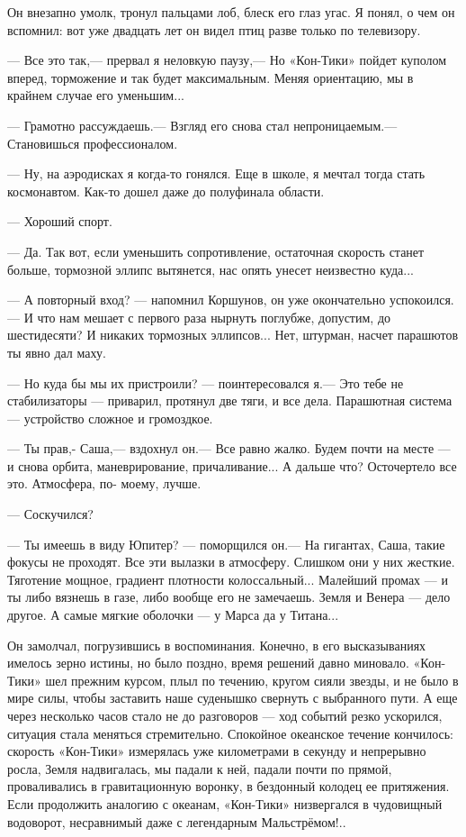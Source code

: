 \documentclass[11pt,a4paper,oneside]{article}
\begin{document}
Он внезапно умолк, тронул пальцами лоб, блеск его глаз угас. Я понял, о чем он вспомнил: вот уже двадцать лет он видел птиц разве только по телевизору.

— Все это так,— прервал я неловкую паузу,— Но «Кон-Тики» пойдет куполом вперед, торможение и так будет максимальным. Меняя ориентацию, мы в крайнем случае его уменьшим...

— Грамотно рассуждаешь.— Взгляд его снова стал непроницаемым.— Становишься профессионалом.

— Ну, на аэродисках я когда-то гонялся. Еще в школе, я мечтал тогда стать космонавтом. Как-то дошел даже до полуфинала области.

— Хороший спорт.

— Да. Так вот, если уменьшить сопротивление, остаточная скорость станет больше, тормозной эллипс вытянется, нас опять унесет неизвестно куда...

— А повторный вход? — напомнил Коршунов, он уже окончательно успокоился.— И что нам мешает с первого раза нырнуть поглубже, допустим, до шестидесяти? И никаких тормозных эллипсов... Нет, штурман, насчет парашютов ты явно дал маху.

— Но куда бы мы их пристроили? — поинтересовался я.— Это тебе не стабилизаторы — приварил, протянул две тяги, и все дела. Парашютная система — устройство сложное и громоздкое.

— Ты прав,- Саша,— вздохнул он.— Все равно жалко. Будем почти на месте — и снова орбита, маневрирование, причаливание... А дальше что? Осточертело все это. Атмосфера, по- моему, лучше.

— Соскучился?

— Ты имеешь в виду Юпитер? — поморщился он.— На гигантах, Саша, такие фокусы не проходят. Все эти вылазки в атмосферу. Слишком они у них жесткие. Тяготение мощное, градиент плотности колоссальный... Малейший промах — и ты либо вязнешь в газе, либо вообще его не замечаешь. Земля и Венера — дело другое. А самые мягкие оболочки — у Марса да у Титана...

Он замолчал, погрузившись в воспоминания. Конечно, в его высказываниях имелось зерно истины, но было поздно, время решений давно миновало. «Кон-Тики» шел прежним курсом, плыл по течению, кругом сияли звезды, и не было в мире силы, чтобы заставить наше суденышко свернуть с выбранного пути. А еще через несколько часов стало не до разговоров — ход событий резко ускорился, ситуация стала меняться стремительно. Спокойное океанское течение кончилось: скорость «Кон-Тики» измерялась уже километрами в секунду и непрерывно росла, Земля надвигалась, мы падали к ней, падали почти по прямой, проваливались в гравитационную воронку, в бездонный колодец ее притяжения. Если продолжить аналогию с океанам, «Кон-Тики» низвергался в чудовищный водоворот, несравнимый даже с легендарным Мальстрёмом!..
\end{document}
